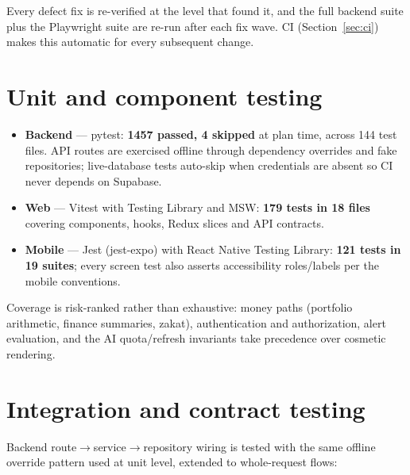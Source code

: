 \documentclass[11pt,a4paper]{article}
\begin{document}
Every defect fix is re-verified at the level that found it, and the full
backend suite plus the Playwright suite are re-run after each fix wave. CI
(Section~\ref{sec:ci}) makes this automatic for every subsequent change.

\section{Unit and component testing}\label{sec:unit}

\begin{itemize}
  \item \textbf{Backend} --- pytest: \textbf{1457 passed, 4 skipped} at plan time,
        across 144 test files. API routes are exercised offline through
        dependency overrides and fake repositories; live-database tests
        auto-skip when credentials are absent so CI never depends on Supabase.
  \item \textbf{Web} --- Vitest with Testing Library and MSW: \textbf{179 tests in
        18 files} covering components, hooks, Redux slices and API contracts.
  \item \textbf{Mobile} --- Jest (jest-expo) with React Native Testing Library:
        \textbf{121 tests in 19 suites}; every screen test also asserts
        accessibility roles/labels per the mobile conventions.
\end{itemize}

Coverage is risk-ranked rather than exhaustive: money paths (portfolio
arithmetic, finance summaries, zakat), authentication and authorization, alert
evaluation, and the AI quota/refresh invariants take precedence over cosmetic
rendering.

\section{Integration and contract testing}\label{sec:integration}

Backend route$\rightarrow$service$\rightarrow$repository wiring is tested with the same
offline override pattern used at unit level, extended to whole-request flows:
\end{document}
